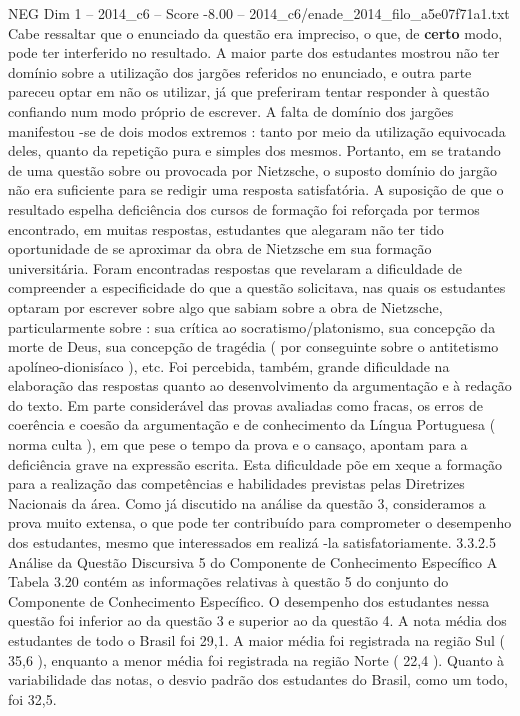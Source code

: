 \begin{textsample}{NEG Dim 1 – 2014\_c6 – Score -8.00 – 2014\_c6/enade\_2014\_filo\_a5e07f71a1.txt}
Cabe ressaltar que o enunciado da questão era impreciso, o que, de \textbf{certo} modo, pode ter interferido no resultado.
A maior parte dos estudantes mostrou não ter domínio sobre a utilização dos jargões referidos no enunciado, e outra parte pareceu optar em não os utilizar, já que preferiram tentar responder à questão confiando num modo próprio de escrever.
A falta de domínio dos jargões manifestou -se de dois modos extremos : tanto por meio da utilização equivocada deles, quanto da repetição pura e simples dos mesmos.
Portanto, em se tratando de uma questão sobre ou provocada por Nietzsche, o suposto domínio do jargão não era suficiente para se redigir uma resposta satisfatória.
A suposição de que o resultado espelha deficiência dos cursos de formação foi reforçada por termos encontrado, em muitas respostas, estudantes que alegaram não ter tido oportunidade de se aproximar da obra de Nietzsche em sua formação universitária.
Foram encontradas respostas que revelaram a dificuldade de compreender a especificidade do que a questão solicitava, nas quais os estudantes optaram por escrever sobre algo que sabiam sobre a obra de Nietzsche, particularmente sobre : sua crítica ao socratismo/platonismo, sua concepção da morte de Deus, sua concepção de tragédia ( por conseguinte sobre o antitetismo apolíneo-dionisíaco ), etc.
Foi percebida, também, grande dificuldade na elaboração das respostas quanto ao desenvolvimento da argumentação e à redação do texto.
Em parte considerável das provas avaliadas como fracas, os erros de coerência e coesão da argumentação e de conhecimento da Língua Portuguesa ( norma culta ), em que pese o tempo da prova e o cansaço, apontam para a deficiência grave na expressão escrita.
Esta dificuldade põe em xeque a formação para a realização das competências e habilidades previstas pelas Diretrizes Nacionais da área.
Como já discutido na análise da questão 3, consideramos a prova muito extensa, o que pode ter contribuído para comprometer o desempenho dos estudantes, mesmo que interessados em realizá -la satisfatoriamente. 3.3.2.5 Análise da Questão Discursiva 5 do Componente de Conhecimento Específico A Tabela 3.20 contém as informações relativas à questão 5 do conjunto do Componente de Conhecimento Específico.
O desempenho dos estudantes nessa questão foi inferior ao da questão 3 e superior ao da questão 4.
A nota média dos estudantes de todo o Brasil foi 29,1.
A maior média foi registrada na região Sul ( 35,6 ), enquanto a menor média foi registrada na região Norte ( 22,4 ).
Quanto à variabilidade das notas, o desvio padrão dos estudantes do Brasil, como um todo, foi 32,5.

\end{textsample}
